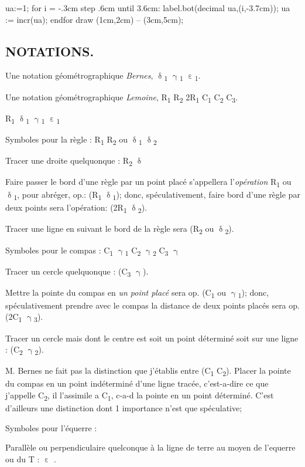 \documentclass[12pt,a4paper,twocolumn]{book} %
\newcommand{\Ra}[1]{\textcolor{rtLightBlue900}R\textsubscript{\textcolor{rtLightBlue900}{#1}}}
\newcommand{\Rab}[1]{\small{\textcolor{rtLightBlue900}{2}}\textcolor{rtLightBlue900}R\textsubscript{\textcolor{rtLightBlue900}{#1}}}
\newcommand{\gd}[1]{\textbf{$\updelta$}\textsubscript{#1}}
\newcommand{\gc}[1]{\textbf{$\upgamma$}\textsubscript{#1}}
\newcommand{\gq}[1]{\textbf{$\upepsilon$}\textsubscript{#1}}
\newcommand{\Ca}[1]{\textcolor{rtLightBlue900}C\textsubscript{\textcolor{rtLightBlue900}{#1}}}
\begin{document}
\begin{mpdisplay}
ua:=1;
for i = -.3cm step .6cm until 3.6cm:
    label.bot(decimal ua,(i,-3.7cm));
    ua := incr(ua);
endfor
  draw (1cm,2cm) -- (3cm,5cm);
\end{mpdisplay}


\subsection{NOTATIONS.}

Une notation géométrographique \emph{Bernes},  \gd{1} \gc{1} \gq{1}.

Une notation géométrographique \emph{Lemoine}, \Ra{1} \Ra{2} \Rab{1} \Ca{1} \Ca{2} \Ca{3}.


\Ra{1} \gd{1} \gc{1} \gq{1}

Symboles pour la règle : \Ra{1} \Ra{2} ou \gd{1} \gd{2}


Tracer une droite quelquonque : \Ra{2}  \gd{}

Faire passer le bord d'une règle par un point placé s'appellera l'\emph{opération} \Ra{1} ou \gd{1}, pour abréger, op.: (\Ra{1} \gd{1}); donc, spéculativement, faire bord d'une règle par deux points sera l'opération: (\Rab{1}  \gd{2}).


Tracer une ligne en suivant le bord de la règle sera (\Ra{2} ou \gd{2}).

Symboles pour le compas : \Ca{1} \gc{1} \Ca{2} \gc{2} \Ca{3}  \gc{}

Tracer un cercle quelquonque : (\Ca{3} \gc{}).


Mettre la pointe du compas en \emph{un point placé} sera op. (\Ca{1} ou \gc{1}); donc, spéculativement prendre avec le compas la distance de deux points placés sera op. (2\Ca{1} \gc{3}).

Tracer un cercle mais dont le centre est soit un point déterminé soit sur une ligne  : (\Ca{2} \gc{2}).




M. Bernes ne fait pas la distinction que j'établis entre (\Ca{1} \Ca{2}). Placer la pointe du compas en un point indéterminé d'une ligne tracée, c'est-a-dire ce que j'appelle \Ca{2}, il l'assimile a
\Ca{1}, c-a-d la pointe en un point déterminé. C'est d'ailleurs
une distinction dont 1 importance n'est que spéculative;


Symboles pour l'équerre :

Parallèle ou perpendiculaire quelconque à la ligne de terre au moyen de l'equerre ou du T : \gq{} .
\end{document}

